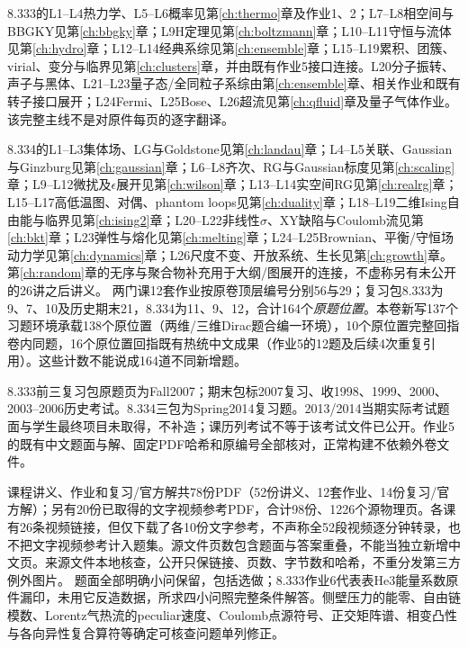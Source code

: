 8.333的L1--L4热力学、L5--L6概率见第\ref{ch:thermo}章及作业1、2；L7--L8相空间与BBGKY见第\ref{ch:bbgky}章；L9H定理见第\ref{ch:boltzmann}章；L10--L11守恒与流体见第\ref{ch:hydro}章；L12--L14经典系综见第\ref{ch:ensemble}章；L15--L19累积、团簇、virial、变分与临界见第\ref{ch:clusters}章，并由既有作业5接口连接。L20分子振转、声子与黑体、L21--L23量子态/全同粒子系综由第\ref{ch:ensemble}章、相关作业和既有转子接口展开；L24Fermi、L25Bose、L26超流见第\ref{ch:qfluid}章及量子气体作业。该完整主线不是对原件每页的逐字翻译。

8.334的L1--L3集体场、LG与Goldstone见第\ref{ch:landau}章；L4--L5关联、Gaussian与Ginzburg见第\ref{ch:gaussian}章；L6--L8齐次、RG与Gaussian标度见第\ref{ch:scaling}章；L9--L12微扰及$\epsilon$展开见第\ref{ch:wilson}章；L13--L14实空间RG见第\ref{ch:realrg}章；L15--L17高低温图、对偶、phantom loops见第\ref{ch:duality}章；L18--L19二维Ising自由能与临界见第\ref{ch:ising2}章；L20--L22非线性$\sigma$、XY缺陷与Coulomb流见第\ref{ch:bkt}章；L23弹性与熔化见第\ref{ch:melting}章；L24--L25Brownian、平衡/守恒场动力学见第\ref{ch:dynamics}章；L26尺度不变、开放系统、生长见第\ref{ch:growth}章。第\ref{ch:random}章的无序与聚合物补充用于大纲/图展开的连接，不虚称另有未公开的26讲之后讲义。
两门课12套作业按原卷顶层编号分别56与29；复习包8.333为9、7、10及历史期末21，8.334为11、9、12，合计164个\emph{原题位置}。本卷新写137个习题环境承载138个原位置（两维/三维Dirac题合编一环境），10个原位置完整回指卷内同题，16个原位置回指既有热统中文成果（作业5的12题及后续4次重复引用）。这些计数不能说成164道不同新增题。

8.333前三复习包原题页为Fall2007；期末包标2007复习、收1998、1999、2000、2003--2006历史考试。8.334三包为Spring2014复习题。2013/2014当期实际考试题面与学生最终项目未取得，不补造；课历列考试不等于该考试文件已公开。作业5的既有中文题面与解、固定PDF哈希和原编号全部核对，正常构建不依赖外卷文件。

课程讲义、作业和复习/官方解共78份PDF（52份讲义、12套作业、14份复习/官方解）；另有20份已取得的文字视频参考PDF，合计98份、1226个源物理页。各课有26条视频链接，但仅下载了各10份文字参考，不声称全52段视频逐分钟转录，也不把文字视频参考计入题集。源文件页数包含题面与答案重叠，不能当独立新增中文页。来源文件本地核查，公开只保链接、页数、字节数和哈希，不重分发第三方例外图片。
题面全部明确小问保留，包括选做；8.333作业6代表表He3能量系数原件漏印，未用它反造数据，所求四小问照完整条件解答。侧壁压力的能零、自由链模数、Lorentz气热流的peculiar速度、Coulomb点源符号、正交矩阵谱、相变凸性与各向异性复合算符等确定可核查问题单列修正。

